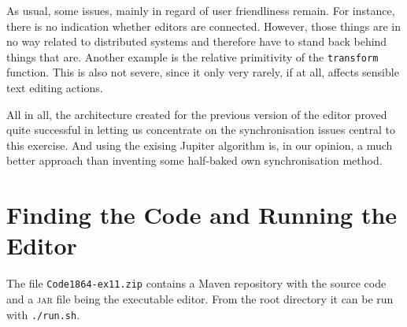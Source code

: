 \documentclass[a4paper,draft,12pt,oneside,article,table]{memoir}
\newcommand{\mil}[1]{\texttt{#1}}
\begin{document}
As usual, some issues, mainly in regard of user friendliness remain. For
instance, there is no indication whether editors are connected. However,
those things are in no way related to distributed systems and therefore
have to stand back behind things that are. Another example is the
relative primitivity of the \mil{transform} function. This is also not
severe, since it only very rarely, if at all, affects sensible text
editing actions.

All in all, the architecture created for the previous version of the
editor proved quite successful in letting us concentrate on the
synchronisation issues central to this exercise. And using the exising
Jupiter algorithm is, in our opinion, a much better approach than
inventing some half-baked own synchronisation method.

\appendix

\chapter{Finding the Code and Running the Editor}

The file \texttt{Code1864-ex11.zip} contains a Maven repository with the source
code and a \textsc{jar} file being the executable editor. From the
root directory it can be run with \texttt{./run.sh}.


\setlength{\RaggedRightRightskip}{0pt plus 4em} %
\RaggedRight
{}
\printbibliography
\end{document}
